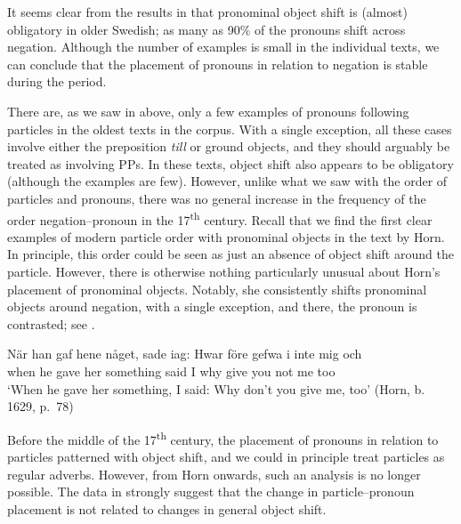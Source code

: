 \documentclass[output=paper]{langscibook}
\begin{document}
It seems clear from the results in  that pronominal object shift is (almost) obligatory in older Swedish; as many as 90\% of the pronouns shift across negation. Although the number of examples is small in the individual texts, we can conclude that the placement of pronouns in relation to negation is stable during the period.



There are, as we saw in  above, only a few examples of pronouns following particles in the oldest texts in the corpus. With a single exception, all these cases involve either the preposition \textit{till} or ground objects, and they should arguably be treated as involving PPs. In these texts, object shift also appears to be obligatory (although the examples are few). However, unlike what we saw with the order of particles and pronouns, there was no general increase in the frequency of the order negation–pronoun in the 17\textsuperscript{th} century. Recall that we find the first clear examples of modern particle order with pronominal objects in the text by Horn. In principle, this order could be seen as just an absence of object shift around the particle. However, there is otherwise nothing particularly unusual about Horn’s placement of pronominal objects. Notably, she consistently shifts pronominal objects around negation, with a single exception, and there, the pronoun is contrasted; see .


\ea\label{ex:lalu:52}
\gll  När       han  gaf   hene   någet,       sade   iag:   {Hwar före} gefwa   i     inte   mig   och\\
when    he   gave   her   something   said   I       why   give     you   not   me   too\\
\glt `When he gave her something, I said: Why don’t you give me, too’ (Horn, b. 1629, p.~78)\\
\z


Before the middle of the 17\textsuperscript{th} century, the placement of pronouns in relation to particles patterned with object shift, and we could in principle treat particles as regular adverbs. However, from Horn onwards, such an analysis is no longer possible. The data in  strongly suggest that the change in particle–pronoun placement is not related to changes in general object shift.
\end{document}
